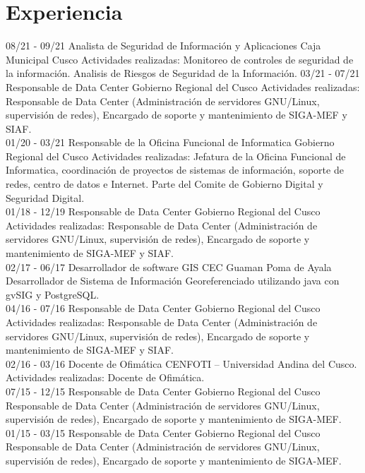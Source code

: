 \documentclass[]{friggeri-cv}
\begin{document}
\section{Experiencia}
\begin{entrylist}
    \entry
    {08/21 - 09/21}
    {Analista de Seguridad de Información y Aplicaciones}
    {Caja Municipal Cusco}
    {Actividades realizadas: Monitoreo de controles de seguridad de la información. Analisis de Riesgos de Seguridad
    de la Información.}
    \entry
    {03/21 - 07/21}
    {Responsable de Data Center}
    {Gobierno Regional del Cusco}
    {Actividades realizadas: Responsable de Data Center (Administraci\'on de servidores GNU/Linux, supervisi\'on
    de redes), Encargado de soporte y mantenimiento de SIGA-MEF y SIAF.\\}
    \entry
    {01/20 - 03/21}
    {Responsable de la Oficina Funcional de Informatica}
    {Gobierno Regional del Cusco}
    {Actividades realizadas: Jefatura de la Oficina Funcional de Informatica, coordinación de proyectos de sistemas de información,
     soporte de redes, centro de datos e Internet. Parte del Comite de Gobierno Digital y Seguridad Digital.\\}
    \entry
    {01/18 - 12/19}
    {Responsable de Data Center}
    {Gobierno Regional del Cusco}
    {Actividades realizadas: Responsable de Data Center (Administraci\'on de servidores GNU/Linux, supervisi\'on
    de redes), Encargado de soporte y mantenimiento de SIGA-MEF y SIAF.\\}
    \entry
    {02/17 - 06/17}
    {Desarrollador de software GIS}
    {CEC Guaman Poma de Ayala}
    {Desarrollador de Sistema de Informaci\'on Georeferenciado utilizando java con gvSIG y PostgreSQL.\\}
    \entry
    {04/16 - 07/16}
    {Responsable de Data Center}
    {Gobierno Regional del Cusco}
    {Actividades realizadas: Responsable de Data Center (Administraci\'on de servidores GNU/Linux, supervisi\'on
    de redes), Encargado de soporte y mantenimiento de SIGA-MEF y SIAF.\\}
    \entry
    {02/16 - 03/16}
    {Docente de Ofim\'atica}
    {CENFOTI – Universidad Andina del Cusco.}
    {Actividades realizadas: Docente de Ofim\'atica.\\}
    \entry
    {07/15 - 12/15}
    {Responsable de Data Center}
    {Gobierno Regional del Cusco}
    {Responsable de Data Center (Administraci\'on de servidores GNU/Linux, supervisi\'on de redes), Encargado de
    soporte y mantenimiento de SIGA-MEF.\\}
    \entry
    {01/15 - 03/15}
    {Responsable de Data Center}
    {Gobierno Regional del Cusco}
    {Responsable de Data Center (Administraci\'on de servidores GNU/Linux, supervisi\'on de redes), Encargado de
    soporte y mantenimiento de SIGA-MEF.\\}
\end{entrylist}
\end{document}
